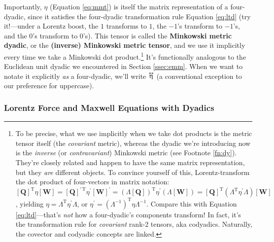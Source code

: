 \documentclass[12pt]{article}
\renewcommand{\vv}[1]{\mathbf{#1}}
\newcommand{\tightoverset}[2]{%
  \mathop{#2}\limits^{\vbox to -.5ex{\kern-0.75ex\hbox{$#1$}\vss}}}
\newcommand{\inlinedy}[1]{\tightoverset{\text{\tiny$\bm\leftrightarrow$}}{#1}}
\begin{document}
Importantly, $\eta$ (Equation \ref{eq:mmt}) is itself the matrix representation of a four-dyadic, since it satisfies the four-dyadic transformation rule Equation \ref{eq:ltd} (try it!---under a Lorentz boost, the $1$ transforms to $1$, the $-1$'s transform to $-1$'s, and the $0$'s transform to $0$'s). This tensor is called the \textbf{Minkowski metric dyadic}, or the \textbf{(inverse) Minkowski metric tensor}, and we use it implicitly every time we take a Minkowski dot product.\footnote{\label{fn:cov}To be precise, what we use implicitly when we take dot products is the metric tensor itself (the \emph{covariant} metric), whereas the dyadic we're introducing now is the \emph{inverse} (or \emph{contravariant}) Minkowski metric (see Footnote \ref{fn:dy}). They're closely related and happen to have the same matrix representation, but they \emph{are} different objects. To convince yourself of this, Lorentz-transform the dot product of four-vectors in matrix notation: ${[ \vv Q ] ^\mathrm{T} \eta [ \vv W ] = [ \vv Q ] ^{\prime \, \mathrm{T}} \eta ^\prime [ \vv W ]^\prime =  ( \Lambda [ \vv Q ] ) ^\mathrm{T} \eta ^\prime ( \Lambda [ \vv W ] ) = [ \vv Q ] ^\mathrm{T} ( \Lambda ^\mathrm{T} \eta^ \prime \Lambda ) [ \vv W ]} $, yielding $ \eta = \Lambda ^\mathrm{T} \eta^ \prime \Lambda $, or $\eta ^\prime = ( \Lambda ^{-1} ) ^\mathrm{T} \eta \Lambda ^{-1} $. Compare this with Equation \ref{eq:ltd}---that's \emph{not} how a four-dyadic's components transform! In fact, it's the transformation rule for \emph{covariant} rank-2 tensors, aka codyadics. Naturally, the covector and codyadic concepts are linked.} It's functionally analogous to the Euclidean unit dyadic we encountered in Section \ref{ssec:emm}. When we want to notate it explicitly \emph{as} a four-dyadic, we'll write $\inlinedy{\upeta}$ (a conventional exception to our preference for uppercase).

\subsubsection{Lorentz Force and Maxwell Equations with Dyadics}
\end{document}
